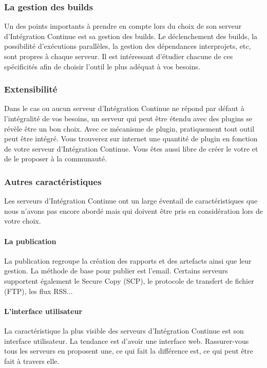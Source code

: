       \subsubsection{La gestion des builds}
      Un des points importants à prendre en compte lors du choix de son serveur d'Intégration Continue est sa gestion des builds. Le déclenchement des builds, la possibilité d'exécutions parallèles, la gestion des dépendances interprojets, etc, sont propres à chaque serveur. Il est intéressant d'étudier chacune de ces spécificités afin de choisir l'outil le plus adéquat à vos besoins.

      \subsubsection{Extensibilité}
      Dans le cas ou aucun serveur d'Intégration Continue ne répond par défaut à l'intégralité de vos besoins, un serveur qui peut être étendu avec des plugins se révèle être un bon choix. Avec ce mécanisme de plugin, pratiquement tout outil peut être intégré. Vous trouverez sur internet une quantité de plugin en fonction de votre serveur d'Intégration Continue. Vous êtes aussi libre de créer le votre et de le proposer à la communauté.

      \subsubsection{Autres caractéristiques}
      Les serveurs d'Intégration Continue ont un large éventail de caractéristiques que nous n'avons pas encore abordé mais qui doivent être pris en considération lors de votre choix.
      \paragraph{La publication} La publication regroupe la création des rapports et des artefacts ainsi que leur gestion. La méthode de base pour publier est l'email. Certains serveurs supportent également le Secure Copy (SCP), le protocole de transfert de fichier (\gls{FTP}), les flux RSS...
      \paragraph{L'interface utilisateur} La caractéristique la plus visible des serveurs d'Intégration Continue est son interface utilisateur. La tendance est d'avoir une interface web. Rassurer-vous tous les serveurs en proposent une, ce qui fait la différence est, ce qui peut être fait à travers elle.

